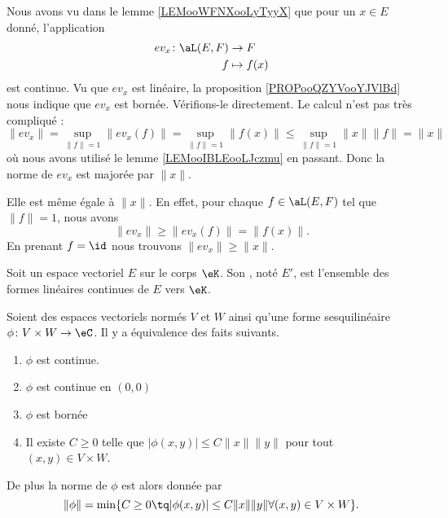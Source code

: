 \begin{example}     \label{EXooTQPEooRRdddt}
    Nous avons vu dans le lemme \ref{LEMooWFNXooLyTyyX} que pour un \( x\in E\) donné, l'application
    \begin{equation}
        \begin{aligned}
            ev_x\colon \aL(E,F)&\to F \\
            f&\mapsto f(x) 
        \end{aligned}
    \end{equation}
    est continue. Vu que \( ev_x\) est linéaire, la proposition \ref{PROPooQZYVooYJVlBd} nous indique que \( ev_x\) est bornée. Vérifions-le directement. Le calcul n'est pas très compliqué :
    \begin{equation}
        \| ev_x \|=\sup_{\| f \|=1}\| ev_x(f) \|=\sup_{\| f \|=1}\| f(x) \|\leq \sup_{\| f \|=1}\| x \|\| f \|=\| x \|
    \end{equation}
    où nous avons utilisé le lemme \ref{LEMooIBLEooLJczmu} en passant. Donc la norme de \( ev_x\) est majorée par \( \| x \|\).

    Elle est même égale à \( \| x \|\). En effet, pour chaque \( f\in \aL(E,F)\) tel que \(  \| f \|=1\), nous avons
    \begin{equation}
        \| ev_x \|\geq \| ev_x(f) \|=\| f(x) \|.
    \end{equation}
    En prenant \( f=\id\) nous trouvons \(  \| ev_x \|\geq \| x \|  \).
\end{example}

\begin{definition}      \label{DEFooKSDFooGIBtrG}
    Soit un espace vectoriel \( E\) sur le corps \( \eK\). Son , noté \( E'\), est l'ensemble des formes linéaires continues de \( E\) vers \( \eK\).
\end{definition}

\begin{proposition}      \label{PROPooQFTSooPFfbCc}
    Soient des espaces vectoriels normés \( V\) et \( W\) ainsi qu'une forme sesquilinéaire \( \phi\colon V\times W\to \eC\). Il y a équivalence des faits suivants.
    \begin{enumerate}
        \item
            \( \phi\) est continue.
        \item
            \( \phi\) est continue en \( (0,0)\)
        \item
            \( \phi\) est bornée
        \item
            Il existe \( C\geq 0\) telle que \( | \phi(x,y) |\leq C\| x \|\| y \|  \) pour tout \( (x,y)\in V\times W\).
    \end{enumerate}
    De plus la norme de \( \phi\) est alors donnée par
    \begin{equation}
        \| \phi \|=\min\{  C\geq 0\tq | \phi(x,y) |\leq C\| x \|\| y \|\forall (x,y)\in V\times W  \}.
    \end{equation}
\end{proposition}

